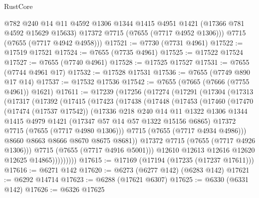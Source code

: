 \begin{lexlean}{RustCore}
\begin{coremodule}
        @782
        @240
        @14
        @11
        @4592
        @1306
        @1344
        @1415
        @4951
        @1421
        (@17366 @781 @4592 @15629 @15633)
        @17372
        @7715
        (@7655 (@7717 @4952 @1306)))
      @7715
      (@7655 (@7717 @4942 @4958)))
@17521 := @7730 (@7731 @4961)
@17522 := @17519 @17521
@17524 := @7655 (@7735 @4961)
@17525 := @17522 @17524
@17527 := @7655 (@7740 @4961)
@17528 := @17525 @17527
@17531 := @7655 (@7744 @4961 @17)
@17532 := @17528 @17531
@17536 := @7655 (@7749 @890 @17 @14)
@17537 := @17532 @17536
@17542 := @7655 (@7665 (@7666 (@7755 @4961)) @1621)
@17611 := @17239
    (@17256
      (@17274
        (@17291
          (@17304
            (@17313
              (@17317
                (@17392
                  (@17415
                    (@17423
                      (@17438
                        (@17448
                          (@17453
                            (@17460
                              (@17470
                                (@17474 (@17537 @17542))
                                (@17336
                                  @218
                                  @240
                                  @14
                                  @11
                                  @1322
                                  @1306
                                  @1344
                                  @1415
                                  @4979
                                  @1421
                                  (@17347 @57 @14 @57 @1322 @15156 @6865)
                                  @17372
                                  @7715
                                  (@7655 (@7717 @4980 @1306)))
                                @7715
                                (@7655 (@7717 @4934 @4986)))
                              @8660
                              @8663
                              @8666
                              @8670
                              @8675
                              @8681))
                          @17372
                          @7715
                          (@7655 (@7717 @4926 @1306)))
                        @7715
                        (@7655 (@7717 @4916 @5001)))
                      @12610
                      @12613
                      @12616
                      @12620
                      @12625
                      @14865)))))))))
@17615 := @17169 (@17194 (@17235 (@17237 @17611)))
@17616 := @6271 @142
@17620 := @6273 (@6277 @142) (@6283 @142)
@17621 := @6292 @14714
@17623 := @6288 (@17621 @6307)
@17625 := @6330 (@6331 @142)
@17626 := @6326 @17625

\end{coremodule}
\end{lexlean}

